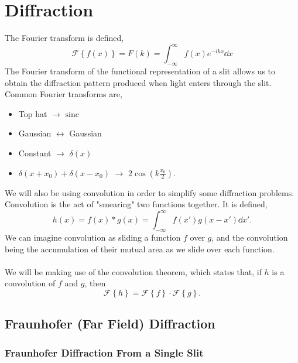 \documentclass{book}
\begin{document}
{\chapter{Diffraction}
The Fourier transform is defined,
\begin{equation}
	\mathcal{F}\left\{f(x)\right\} = F(k) = \int_{-\infty}^{\infty}f(x)e^{-ikx}\dd{x}
\end{equation}
The Fourier transform of the functional representation of a slit allows us to obtain the diffraction pattern produced when light enters through the slit. Common Fourier transforms are,
\begin{itemize}
	\item Top hat $\rightarrow$ $\text{sinc}$
	\item Gaussian $\leftrightarrow$ Gaussian
	\item Constant $\to$ $\delta(x)$
	\item $\delta(x + x_0) + \delta(x - x_0)$ $\to$ $2\cos(k\frac{x_0}{2})$.
\end{itemize} 
We will also be using convolution in order to simplify some diffraction problems. Convolution is the act of "smearing" two functions together. It is defined,
\begin{equation}
	h(x) = f(x) * g(x) = \int_{-\infty}^{\infty}f(x')g(x-x')\dd{x'}.
\end{equation}
We can imagine convolution as sliding a function $f$ over $g$, and the convolution being the accumulation of their mutual area as we slide over each function.
\\\\
We will be making use of the convolution theorem, which states that, if $h$ is a convolution of $f$ and $g$, then
\begin{equation}
	\mathcal{F}\left\{h\right\} = \mathcal{F}\left\{f\right\}\cdot\mathcal{F}\left\{g\right\}.
\end{equation}
\section{Fraunhofer (Far Field) Diffraction}
\subsection{Fraunhofer Diffraction From a Single Slit}
\begin{figure}[h]
	\centering
\end{figure}}
\end{document}
